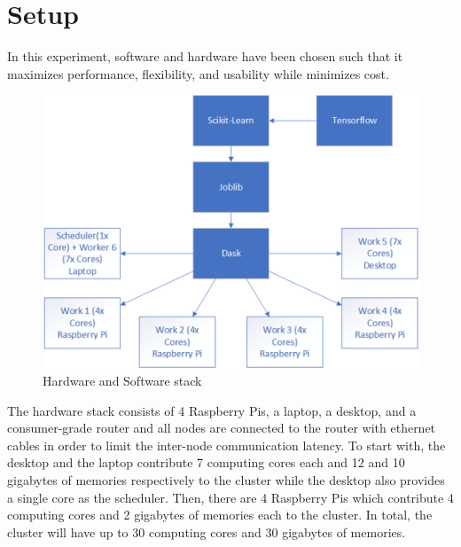 \documentclass[conference]{IEEEtran}
\begin{document}
    \section{Setup}
        In this experiment, software and hardware have been chosen such that it maximizes performance, flexibility, and usability while minimizes cost. 
        
        \begin{figure}[!htb]
            \centering
            \captionsetup{justification=centering}
            \includegraphics[width=\linewidth]{Stack.png}
            \caption{Hardware and Software stack}  
        \end{figure}
            
        The hardware stack consists of 4 Raspberry Pis, a laptop, a desktop, and a consumer-grade router and all nodes are connected to the router with ethernet cables in order to limit the inter-node communication latency. To start with, the desktop and the laptop contribute 7 computing cores each and 12 and 10 gigabytes of memories respectively to the cluster while the desktop also provides a single core as the scheduler. Then, there are 4 Raspberry Pis which contribute 4 computing cores and 2 gigabytes of memories each to the cluster. In total, the cluster will have up to 30 computing cores and 30 gigabytes of memories.
\end{document}
